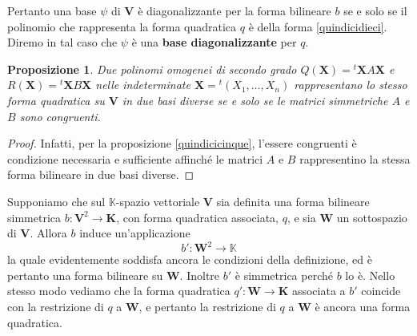 \documentclass{article}
\theoremstyle{plain}
\newtheorem{prop}[thm]{Proposizione}
\theoremstyle{definition}
\theoremstyle{remark}
\begin{document}
\vspace{10pt}

Pertanto una base $\psi$ di $\mathbf{V}$ è diagonalizzante per la forma bilineare $b$ se e solo se il polinomio 
che rappresenta la forma quadratica $q$ è della forma \ref{quindicidieci}. Diremo in tal caso che $\psi$ è una \textbf{base diagonalizzante} per $q$.

\vspace{10pt}

\begin{bxthm}
\begin{prop}
Due polinomi omogenei di secondo grado $Q(\mathbf{X}) = {}^t\mathbf{X}A\mathbf{X}$ e $R(\mathbf{X}) = {}^t\mathbf{X}B\mathbf{X}$ nelle indeterminate $\mathbf{X} = {}^t(X_1, \ldots, X_n)$ rappresentano lo stesso forma 
quadratica su $\mathbf{V}$ in due basi diverse se e solo se le matrici simmetriche $A$ e $B$ sono congruenti.     
\end{prop}
\end{bxthm}
\begin{proof}
Infatti, per la proposizione \ref{quindicicinque}, l'essere congruenti è condizione necessaria e sufficiente 
affinché le matrici $A$ e $B$ rappresentino la stessa forma bilineare in due basi diverse.    
\end{proof}

\vspace{10pt}

Supponiamo che sul $\mathbb{K}$-spazio vettoriale $\mathbf{V}$ sia definita una forma bilineare simmetrica 
$b: \mathbf{V}^2 \to \mathbf{K}$, con forma quadratica associata, $q$, e sia $\mathbf{W}$ 
un sottospazio di $\mathbf{V}$. Allora $b$ induce un'applicazione
\begin{equation}
b': \mathbf{W}^2 \to \mathbb{K}
\end{equation}
la quale evidentemente soddisfa ancora le condizioni della definizione, ed è pertanto una forma bilineare 
su $\mathbf{W}$. Inoltre $b'$ è simmetrica perché $b$ lo è. Nello stesso modo vediamo che la forma quadratica 
$q': \mathbf{W} \to \mathbf{K}$ associata a $b'$ coincide con la restrizione di $q$ a $\mathbf{W}$, e pertanto la restrizione di $q$ 
a $\mathbf{W}$ è  ancora una forma quadratica.

\vspace{10pt}
\end{document}
